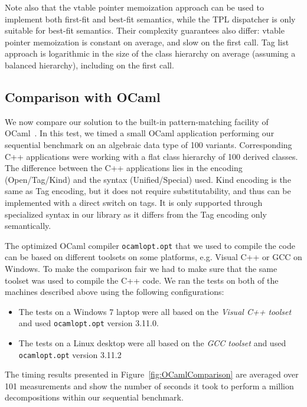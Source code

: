 \documentclass[preprint]{sigplanconf}
\begin{document}
Note also that the vtable pointer memoization approach can be used to implement both
first-fit and best-fit semantics, while the TPL dispatcher is only suitable 
for best-fit semantics. Their complexity guarantees also differ: vtable pointer 
memoization is constant on average, and slow on the first call. Tag list approach is 
logarithmic in the size of the class hierarchy on average (assuming a balanced 
hierarchy), including on the first call.

\subsection{Comparison with OCaml}
\label{sec:ocaml}

We now compare our solution to the built-in pattern-matching facility of OCaml~\cite{OPM01}. 
In this test, we timed a small OCaml application performing our sequential 
benchmark on an algebraic data type of 100 variants. Corresponding C++ 
applications were working with a flat class hierarchy of 100 derived classes. 
The difference between the C++ applications lies in the encoding (Open/Tag/Kind) 
and the syntax (Unified/Special) used. Kind encoding is the same as Tag encoding, but 
it does not require substitutability, and thus can be implemented with a direct 
switch on tags. It is only supported through specialized syntax in our library 
as it differs from the Tag encoding only semantically.

The optimized OCaml compiler \texttt{ocamlopt.opt} that we used to compile the code 
can be based on different toolsets on some platforms, e.g. Visual C++ or GCC 
on Windows. To make the comparison fair we had to make sure that the 
same toolset was used to compile the C++ code. We ran the tests 
on both of the machines described above using the following configurations: 

\begin{itemize}
\setlength{\itemsep}{0pt}
\setlength{\parskip}{0pt}
\item The tests on a Windows 7 laptop were all based on the \emph{Visual C++ toolset} 
      and used \texttt{ocamlopt.opt} version 3.11.0.
\item The tests on a Linux desktop were all based on the \emph{GCC toolset} and used 
      \texttt{ocamlopt.opt} version 3.11.2
\end{itemize}

\noindent
The timing results presented in Figure~\ref{fig:OCamlComparison} are averaged 
over 101 measurements and show the number of seconds it took to perform a 
million decompositions within our sequential benchmark.
\end{document}
